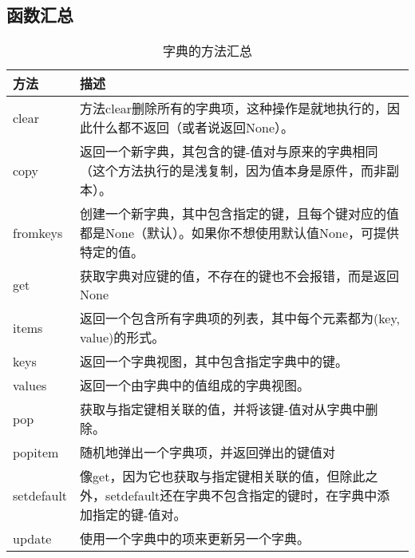 \subsection{函数汇总}
\begin{table}[H]
    \caption{字典的方法汇总}
    \begin{tabularx}{\textwidth}{lX}
        \hline
        方法         & 描述                                                                \\
        \hline
        clear      & 方法clear删除所有的字典项，这种操作是就地执行的，因此什么都不返回（或者说返回None）。                   \\
        copy       & 返回一个新字典，其包含的键-值对与原来的字典相同（这个方法执行的是浅复制，因为值本身是原件，而非副本）。              \\
        fromkeys   & 创建一个新字典，其中包含指定的键，且每个键对应的值都是None（默认）。如果你不想使用默认值None，可提供特定的值。       \\
        get        & 获取字典对应键的值，不存在的键也不会报错，而是返回None                                     \\
        items      & 返回一个包含所有字典项的列表，其中每个元素都为(key, value)的形式。                           \\
        keys       & 返回一个字典视图，其中包含指定字典中的键。                                             \\
        values     & 返回一个由字典中的值组成的字典视图。                                                \\
        pop        & 获取与指定键相关联的值，并将该键-值对从字典中删除。                                        \\
        popitem    & 随机地弹出一个字典项，并返回弹出的键值对                                              \\
        setdefault & 像get，因为它也获取与指定键相关联的值，但除此之外，setdefault还在字典不包含指定的键时，在字典中添加指定的键-值对。 \\
        update     & 使用一个字典中的项来更新另一个字典。                                                \\
        \hline
    \end{tabularx}
\end{table}